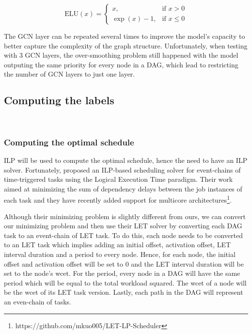 \begin{equation}
\text{ELU}(x) = 
\begin{cases}
x, & \text{if } x > 0 \\
\exp(x) - 1, & \text{if } x \leq 0
\end{cases}
\label{eq:elu}
\end{equation}


The GCN layer can be repeated several times 
to improve the model's capacity to better
capture the complexity of the graph structure.
Unfortunately, when testing with 3 GCN layers,
the over-smoothing problem
still happened with the model outputing
the same priority for every node in a DAG, which lead 
to restricting the number of GCN layers to just one layer.

\subsection{Computing the labels}
~
\label{sec:ilp_calculation}

\subsubsection{Computing the optimal schedule}

ILP will be used to compute the optimal schedule,
hence the need to have an ILP solver.
Fortunately, 
\citet{yip2023letsynchronise} proposed an ILP-based
scheduling solver for event-chains of time-triggered tasks
using the Logical Execution Time paradigm\cite{kirsch2012logical}.
Their work aimed at minimizing the sum of dependency delays 
between the job instances of each task and they have recently added
support for multicore architectures\footnote{https://github.com/mkuo005/LET-LP-Scheduler}.

Although their minimizing problem is slightly different from ours, 
we can convert our minimizing problem and then use their LET solver by converting each DAG task 
to an event-chain of LET task.
To do this, each node needs to be converted to an LET task which 
implies adding an initial offset, activation offset, LET interval duration and a period
to every node.
Hence, for each node, the initial offset and activation offset will
be set to 0 and the LET interval duration will be set to the node's wcet.
For the period, every node in a DAG will have the same period which will
be equal to the total workload squared.
The wcet of a node will be the wcet of its LET task version.
Lastly, each path in the DAG will represent an even-chain of tasks.


